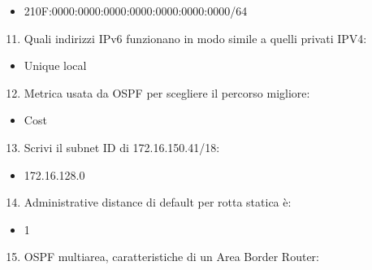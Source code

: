 \documentclass[
]{article}
\providecommand{\tightlist}{%
  \setlength{\itemsep}{0pt}\setlength{\parskip}{0pt}}
\begin{document}
\begin{itemize}
\tightlist
\item
  {210F:0000:0000:0000}{:0000:0000:0000:0000/64}
\end{itemize}

{}

\begin{enumerate}
\setcounter{enumi}{10}
\tightlist
\item
  {Quali indirizzi IPv6 funzionano in modo simile a quelli privati
  IPV4:}
\end{enumerate}

\begin{itemize}
\tightlist
\item
  {Unique local}
\end{itemize}

{}

\begin{enumerate}
\setcounter{enumi}{11}
\tightlist
\item
  {Metrica usata da OSPF per scegliere il percorso migliore:}
\end{enumerate}

\begin{itemize}
\tightlist
\item
  {Cost}
\end{itemize}

{}

\begin{enumerate}
\setcounter{enumi}{12}
\tightlist
\item
  {Scrivi il subnet ID di 172.16.150.41/18:}
\end{enumerate}

\begin{itemize}
\tightlist
\item
  {172.16.128.0}
\end{itemize}

{}

\begin{enumerate}
\setcounter{enumi}{13}
\tightlist
\item
  {Administrative distance di default per rotta statica è:}
\end{enumerate}

\begin{itemize}
\tightlist
\item
  {1}
\end{itemize}

{}

\begin{enumerate}
\setcounter{enumi}{14}
\tightlist
\item
  {OSPF multiarea, caratteristiche di un Area Border Router:}
\end{enumerate}
\end{document}

